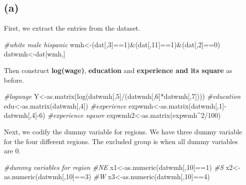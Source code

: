 \documentclass[
]{article}
\newenvironment{Shaded}{\begin{snugshade}}{\end{snugshade}}
\newcommand{\CommentTok}[1]{\textcolor[rgb]{0.56,0.35,0.01}{\textit{#1}}}
\newcommand{\DecValTok}[1]{\textcolor[rgb]{0.00,0.00,0.81}{#1}}
\newcommand{\FunctionTok}[1]{\textcolor[rgb]{0.00,0.00,0.00}{#1}}
\newcommand{\NormalTok}[1]{#1}
\newcommand{\OtherTok}[1]{\textcolor[rgb]{0.56,0.35,0.01}{#1}}
\newcommand{\SpecialCharTok}[1]{\textcolor[rgb]{0.00,0.00,0.00}{#1}}
\begin{document}
\hypertarget{a-1}{%
\subsection{(a)}\label{a-1}}

First, we extract the entries from the dataset.

\begin{Shaded}
\begin{Highlighting}[]
\CommentTok{\#white male hispanic}
\NormalTok{wmh}\OtherTok{\textless{}{-}}\NormalTok{(dat[,}\DecValTok{3}\NormalTok{]}\SpecialCharTok{==}\DecValTok{1}\NormalTok{)}\SpecialCharTok{\&}\NormalTok{(dat[,}\DecValTok{11}\NormalTok{]}\SpecialCharTok{==}\DecValTok{1}\NormalTok{)}\SpecialCharTok{\&}\NormalTok{(dat[,}\DecValTok{2}\NormalTok{]}\SpecialCharTok{==}\DecValTok{0}\NormalTok{)}
\NormalTok{datwmh}\OtherTok{\textless{}{-}}\NormalTok{dat[wmh,]}
\end{Highlighting}
\end{Shaded}

Then construct \textbf{log(wage)}, \textbf{education} and
\textbf{experience and its square} as before.

\begin{Shaded}
\begin{Highlighting}[]
\CommentTok{\#logwage}
\NormalTok{Y}\OtherTok{\textless{}{-}}\FunctionTok{as.matrix}\NormalTok{(}\FunctionTok{log}\NormalTok{(datwmh[,}\DecValTok{5}\NormalTok{]}\SpecialCharTok{/}\NormalTok{(datwmh[,}\DecValTok{6}\NormalTok{]}\SpecialCharTok{*}\NormalTok{datwmh[,}\DecValTok{7}\NormalTok{])))}
\CommentTok{\#education}
\NormalTok{edu}\OtherTok{\textless{}{-}}\FunctionTok{as.matrix}\NormalTok{(datwmh[,}\DecValTok{4}\NormalTok{])}
\CommentTok{\#experience}
\NormalTok{expwmh}\OtherTok{\textless{}{-}}\FunctionTok{as.matrix}\NormalTok{(datwmh[,}\DecValTok{1}\NormalTok{]}\SpecialCharTok{{-}}\NormalTok{datwmh[,}\DecValTok{4}\NormalTok{]}\SpecialCharTok{{-}}\DecValTok{6}\NormalTok{)}
\CommentTok{\#experience sqaure}
\NormalTok{expwmh2}\OtherTok{\textless{}{-}}\FunctionTok{as.matrix}\NormalTok{(expwmh}\SpecialCharTok{\^{}}\DecValTok{2}\SpecialCharTok{/}\DecValTok{100}\NormalTok{)}
\end{Highlighting}
\end{Shaded}

Next, we codify the dummy variable for regions. We have three dummy
variable for the four different regions. The excluded group is when all
dummy variables are \(0\).

\begin{Shaded}
\begin{Highlighting}[]
\CommentTok{\#dummy variables for region}
\CommentTok{\#NE}
\NormalTok{x1}\OtherTok{\textless{}{-}}\FunctionTok{as.numeric}\NormalTok{(datwmh[,}\DecValTok{10}\NormalTok{]}\SpecialCharTok{==}\DecValTok{1}\NormalTok{)}
\CommentTok{\#S}
\NormalTok{x2}\OtherTok{\textless{}{-}}\FunctionTok{as.numeric}\NormalTok{(datwmh[,}\DecValTok{10}\NormalTok{]}\SpecialCharTok{==}\DecValTok{3}\NormalTok{)}
\CommentTok{\#W}
\NormalTok{x3}\OtherTok{\textless{}{-}}\FunctionTok{as.numeric}\NormalTok{(datwmh[,}\DecValTok{10}\NormalTok{]}\SpecialCharTok{==}\DecValTok{4}\NormalTok{)}
\end{Highlighting}
\end{Shaded}
\end{document}

